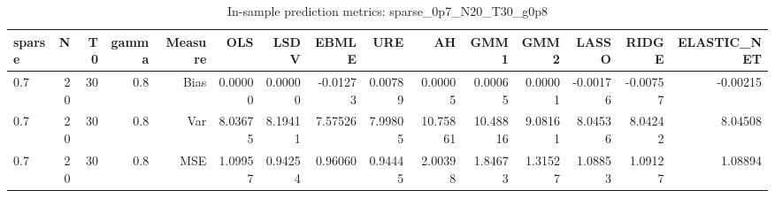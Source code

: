 \begin{table}[!htbp]\centering
\caption{In-sample prediction metrics: sparse_0p7_N20_T30_g0p8}
\label{tab:table2_sparse_0p7_N20_T30_g0p8}
\begin{tabular}{lrrrrrrrrrrrrrr}
\hline
sparse & N & T0 & gamma & Measure & OLS & LSDV & EBMLE & URE & AH & GMM1 & GMM2 & LASSO & RIDGE & ELASTIC_NET \\
\hline
0.7 & 20 & 30 & 0.8 & Bias & 0.00000 & 0.00000 & -0.01273 & 0.00789 & 0.00005 & 0.00065 & 0.00001 & -0.00176 & -0.00757 & -0.00215 \\
0.7 & 20 & 30 & 0.8 & Var & 8.03675 & 8.19411 & 7.57526 & 7.99805 & 10.75861 & 10.48816 & 9.08161 & 8.04536 & 8.04242 & 8.04508 \\
0.7 & 20 & 30 & 0.8 & MSE & 1.09957 & 0.94254 & 0.96060 & 0.94445 & 2.00398 & 1.84673 & 1.31527 & 1.08853 & 1.09127 & 1.08894 \\
\hline
\end{tabular}
\end{table}

